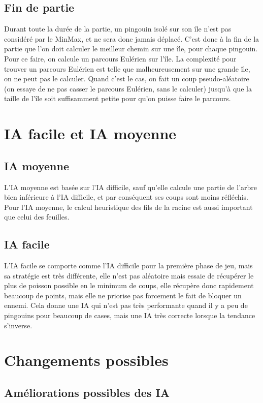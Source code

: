 \documentclass{report}
\begin{document}
\section{Fin de partie}
Durant toute la durée de la partie, un pingouin isolé sur son île n'est pas considéré par le MinMax, et ne sera donc jamais déplacé.
C'est donc à la fin de la partie que l'on doit calculer le meilleur chemin sur une île, pour chaque pingouin.
\newline 
Pour ce faire, on calcule un parcours Eulérien sur l'île. La complexité pour trouver un parcours Eulérien est telle que malheureusement sur une grande île, on ne peut pas le calculer. Quand c'est le cas, on fait un coup pseudo-aléatoire (on essaye de ne pas casser le parcours Eulérien, sans le calculer) jusqu'à que la taille de l'île soit suffisamment petite pour qu'on puisse faire le parcours.

\chapter{IA facile et IA moyenne}

\section{IA moyenne}
L'IA moyenne est basée sur l'IA difficile, sauf qu'elle calcule une partie de l'arbre bien inférieure à l'IA difficile, et par conséquent ses coups sont moins réfléchis.
Pour l'IA moyenne, le calcul heuristique des fils de la racine est aussi important que celui des feuilles.
\section{IA facile}
L'IA facile se comporte comme l'IA difficile pour la première phase de jeu, mais sa stratégie est très différente, elle n'est pas aléatoire mais essaie de récupérer le plus de poisson possible en le minimum de coups, elle récupère donc rapidement beaucoup de points, mais elle ne priorise pas forcement le fait de bloquer un ennemi.
Cela donne une IA qui n'est pas très performante quand il y a peu de pingouins pour beaucoup de cases, mais une IA très correcte lorsque la tendance s'inverse.


\chapter{Changements possibles}
\section{Améliorations possibles des IA}
\end{document}
